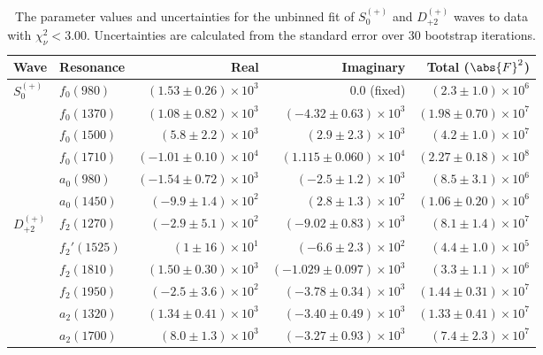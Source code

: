 \begin{table}[h]
    \begin{center}
        \begin{tabular}{llrrr}\toprule
        Wave & Resonance & Real & Imaginary & Total ($\abs{F}^2$) \\\midrule
$S_{0}^{(+)}$ & $f_{0}(980)$ & $(1.53 \pm 0.26) \times 10^{3}$ & $0.0$ (fixed) & $(2.3 \pm 1.0) \times 10^{6}$ \\
 & $f_{0}(1370)$ & $(1.08 \pm 0.82) \times 10^{3}$ & $(-4.32 \pm 0.63) \times 10^{3}$ & $(1.98 \pm 0.70) \times 10^{7}$ \\
 & $f_{0}(1500)$ & $(5.8 \pm 2.2) \times 10^{3}$ & $(2.9 \pm 2.3) \times 10^{3}$ & $(4.2 \pm 1.0) \times 10^{7}$ \\
 & $f_{0}(1710)$ & $(-1.01 \pm 0.10) \times 10^{4}$ & $(1.115 \pm 0.060) \times 10^{4}$ & $(2.27 \pm 0.18) \times 10^{8}$ \\
 & $a_{0}(980)$ & $(-1.54 \pm 0.72) \times 10^{3}$ & $(-2.5 \pm 1.2) \times 10^{3}$ & $(8.5 \pm 3.1) \times 10^{6}$ \\
 & $a_{0}(1450)$ & $(-9.9 \pm 1.4) \times 10^{2}$ & $(2.8 \pm 1.3) \times 10^{2}$ & $(1.06 \pm 0.20) \times 10^{6}$ \\
$D_{+2}^{(+)}$ & $f_{2}(1270)$ & $(-2.9 \pm 5.1) \times 10^{2}$ & $(-9.02 \pm 0.83) \times 10^{3}$ & $(8.1 \pm 1.4) \times 10^{7}$ \\
 & $f_{2}'(1525)$ & $(1 \pm 16) \times 10^{1}$ & $(-6.6 \pm 2.3) \times 10^{2}$ & $(4.4 \pm 1.0) \times 10^{5}$ \\
 & $f_{2}(1810)$ & $(1.50 \pm 0.30) \times 10^{3}$ & $(-1.029 \pm 0.097) \times 10^{3}$ & $(3.3 \pm 1.1) \times 10^{6}$ \\
 & $f_{2}(1950)$ & $(-2.5 \pm 3.6) \times 10^{2}$ & $(-3.78 \pm 0.34) \times 10^{3}$ & $(1.44 \pm 0.31) \times 10^{7}$ \\
 & $a_{2}(1320)$ & $(1.34 \pm 0.41) \times 10^{3}$ & $(-3.40 \pm 0.49) \times 10^{3}$ & $(1.33 \pm 0.41) \times 10^{7}$ \\
 & $a_{2}(1700)$ & $(8.0 \pm 1.3) \times 10^{3}$ & $(-3.27 \pm 0.93) \times 10^{3}$ & $(7.4 \pm 2.3) \times 10^{7}$ \\\bottomrule
        \end{tabular}
    \caption{The parameter values and uncertainties for the unbinned fit of $S_{0}^{(+)}$ and $D_{+2}^{(+)}$ waves to data with $\chi^2_\nu < 3.00$. Uncertainties are calculated from the standard error over $30$ bootstrap iterations.}\label{tab:unbinned-fit-chisqdof-3.0-Sp0p-Dp2p}
    \end{center}
\end{table}
